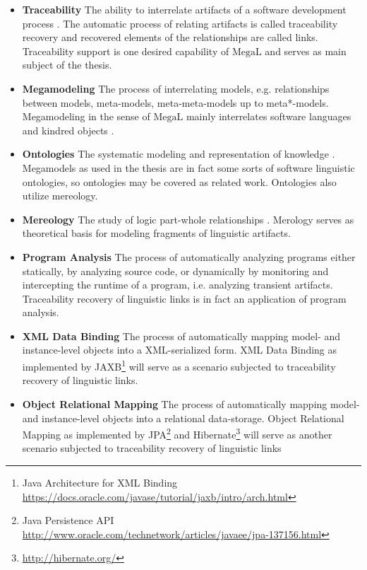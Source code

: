 \documentclass[runningheads,a4paper]{llncs}
\newcommand{\footnoteurl}[1]{\footnote{\url{#1}}}
\newcommand{\megal}{\text{MegaL}}
\begin{document}
\begin{itemize}

\item
\textbf{Traceability}
The ability to interrelate artifacts of a software development process \cite{IEEEGlossary}\cite{Winkler:2010:STR:1861285.1861287}.
The automatic process of relating artifacts is called traceability recovery and recovered elements of the relationships are called links.
Traceability support is one desired capability of $\megal$ and serves as main subject of the thesis.

\item
\textbf{Megamodeling}
The process of interrelating models, e.g. relationships between models, meta-models, meta-meta-models up to meta*-models.
Megamodeling in the sense of $\megal$ mainly interrelates software languages and kindred objects \cite{DBLP:conf/models/FavreLV12}\cite{DBLP:conf/ecmdafa/LammelV14}.

\item
\textbf{Ontologies}
The systematic modeling and representation of knowledge \cite{DBLP:series/ihis/GuarinoOS09}.
Megamodels as used in the thesis are in fact some sorts of software linguistic ontologies, so ontologies may be covered as related work.
Ontologies also utilize mereology.

\item
\textbf{Mereology}
The study of logic part-whole relationships \cite{DBLP:journals/dke/Varzi96}.
Merology serves as theoretical basis for modeling fragments of linguistic artifacts.

\item
\textbf{Program Analysis}
The process of automatically analyzing programs either statically, by analyzing source code, or dynamically by monitoring and intercepting the runtime of a program, i.e. analyzing transient artifacts.
Traceability recovery of linguistic links is in fact an application of program analysis.

\item 
\textbf{XML Data Binding}
The process of automatically mapping model- and instance-level objects into a XML-serialized form.
XML Data Binding as  implemented by JAXB\footnote{Java Architecture for XML Binding \url{https://docs.oracle.com/javase/tutorial/jaxb/intro/arch.html}} will serve as a scenario subjected to traceability recovery of linguistic links.

\item
\textbf{Object Relational Mapping}
The process of automatically mapping model- and instance-level objects into a relational data-storage.
Object Relational Mapping as implemented by JPA\footnote{Java Persistence API \url{http://www.oracle.com/technetwork/articles/javaee/jpa-137156.html}} and Hibernate\footnoteurl{http://hibernate.org/} will serve as another scenario subjected to traceability recovery of linguistic links

\end{itemize}
\end{document}
